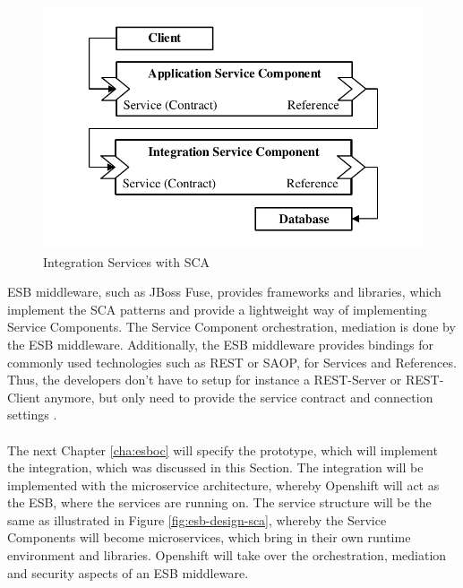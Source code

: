 \begin{figure}[htbp]
	\centering
	\includegraphics[scale=1]{images/esb-sca-example.pdf}
	\caption{Integration Services with SCA}
	\label{fig:esb-design-sca}
\end{figure}
  
ESB middleware, such as JBoss Fuse, provides frameworks and libraries, which implement the SCA patterns and provide a lightweight way of implementing Service Components. The Service Component orchestration, mediation is done by the ESB middleware. Additionally, the ESB middleware provides bindings for commonly used technologies such as REST or SAOP, for Services and References. Thus, the developers don't have to setup for instance a REST-Server or REST-Client anymore, but only need to provide the service contract and connection settings \cite{MicroSoa2008, Richards2015}.
\\ \\
The next Chapter \vref{cha:esboc} will specify the prototype, which will implement the integration, which was discussed in this Section. The integration will be implemented with the microservice architecture, whereby Openshift will act as the ESB, where the services are running on. The service structure will be the same as illustrated in Figure \vref{fig:esb-design-sca}, whereby the Service Components will become microservices, which bring in their own runtime environment and libraries. Openshift will take over the orchestration, mediation and security aspects of an ESB middleware.